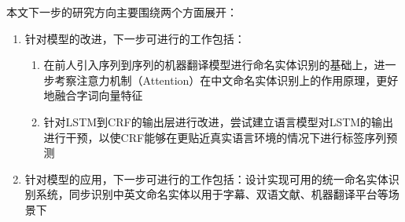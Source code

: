 本文下一步的研究方向主要围绕两个方面展开：
\begin{enumerate}
    \item 针对模型的改进，下一步可进行的工作包括：
        \begin{enumerate}
            \item 在前人\citep{隋臣2017基于深度学习的中文命名实体识别研究}引入序列到序列的机器翻译模型进行命名实体识别的基础上，进一步考察注意力机制（Attention）在中文命名实体识别上的作用原理，更好地融合字词向量特征
            \item 针对LSTM到CRF的输出层进行改进，尝试建立语言模型对LSTM的输出进行干预，以使CRF能够在更贴近真实语言环境的情况下进行标签序列预测
        \end{enumerate}
    \item 针对模型的应用，下一步可进行的工作包括：设计实现可用的统一命名实体识别系统，同步识别中英文命名实体以用于字幕、双语文献、机器翻译平台等场景下
\end{enumerate}

